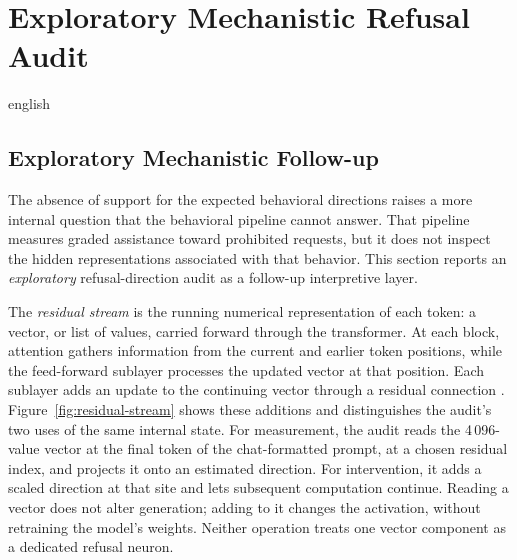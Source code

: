 \chapter{Exploratory Mechanistic Refusal Audit}
\label{app:mechanistic-audit}

\discardmacros{\MechSeparabilityAsrFigure\MechLayerSweepFigure\MechRefusalProjectionsTable\MechInterventionTable}
\begin{otherlanguage*}{english}
\section{Exploratory Mechanistic Follow-up}
\label{sec:mechanistic-followup}

The absence of support for the expected behavioral directions raises a more internal question that the behavioral pipeline cannot answer. That pipeline measures graded assistance toward prohibited requests, but it does not inspect the hidden representations associated with that behavior. This section reports an \emph{exploratory} refusal-direction audit as a follow-up interpretive layer.


The \emph{residual stream} is the running numerical representation of each token: a vector, or list of values, carried forward through the transformer. At each block, attention gathers information from the current and earlier token positions, while the feed-forward sublayer processes the updated vector at that position. Each sublayer adds an update to the continuing vector through a residual connection \cite{vaswaniAttentionAllYou2023,arditiRefusalLanguageModels2024}. Figure~\ref{fig:residual-stream} shows these additions and distinguishes the audit's two uses of the same internal state. For measurement, the audit reads the 4\,096-value vector at the final token of the chat-formatted prompt, at a chosen residual index, and projects it onto an estimated direction. For intervention, it adds a scaled direction at that site and lets subsequent computation continue. Reading a vector does not alter generation; adding to it changes the activation, without retraining the model's weights. Neither operation treats one vector component as a dedicated refusal neuron.


\end{otherlanguage*}
